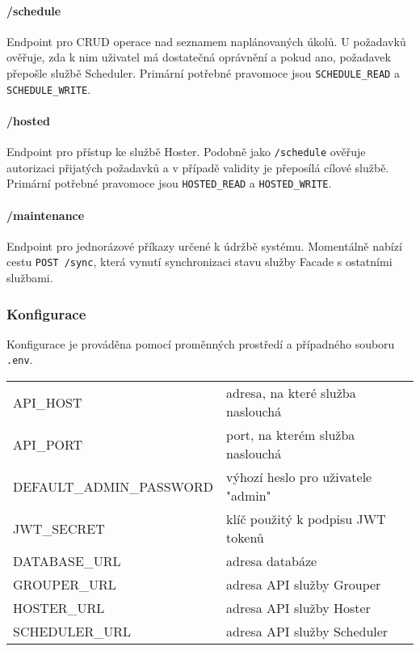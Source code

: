 \paragraph*{/schedule}
Endpoint pro CRUD operace nad seznamem naplánovaných úkolů. U požadavků ověřuje, zda k nim uživatel má dostatečná oprávnění a pokud ano, požadavek přepošle službě Scheduler. Primární potřebné pravomoce jsou \lstinline{SCHEDULE_READ} a \lstinline{SCHEDULE_WRITE}.

\paragraph*{/hosted}
Endpoint pro přístup ke službě Hoster. Podobně jako \lstinline|/schedule| ověřuje autorizaci přijatých požadavků a v případě validity je přeposílá cílové službě. Primární potřebné pravomoce jsou \lstinline{HOSTED_READ} a \lstinline{HOSTED_WRITE}.

\paragraph*{/maintenance}
Endpoint pro jednorázové příkazy určené k údržbě systému. Momentálně nabízí cestu \lstinline|POST /sync|, která vynutí synchronizaci stavu služby Facade s ostatními službami.

\subsubsection{Konfigurace}
Konfigurace je prováděna pomocí proměnných prostředí a případného souboru \lstinline{.env}.
\begin{table}[h]
    \begin{tabular}{ll}
        API\_HOST & adresa, na které služba naslouchá \\
        API\_PORT & port, na kterém služba naslouchá \\
        DEFAULT\_ADMIN\_PASSWORD & výhozí heslo pro uživatele "admin" \\
        JWT\_SECRET & klíč použitý k podpisu JWT tokenů \\
        DATABASE\_URL & adresa databáze \\
        GROUPER\_URL & adresa API služby Grouper \\
        HOSTER\_URL & adresa API služby Hoster \\
        SCHEDULER\_URL & adresa API služby Scheduler \\
    \end{tabular}
\end{table}